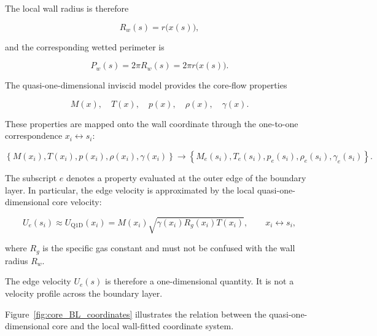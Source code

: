 The local wall radius is therefore

\begin{equation}
    R_w(s)=r\bigl(x(s)\bigr),
    \label{eq:local_wall_radius}
\end{equation}

and the corresponding wetted perimeter is

\begin{equation}
    \boxed{
    P_w(s)
    =
    2\pi R_w(s)
    =
    2\pi r\bigl(x(s)\bigr)
    }.
    \label{eq:wetted_perimeter_BL}
\end{equation}

The quasi-one-dimensional inviscid model provides the core-flow properties

\begin{equation}
    M(x),\quad
    T(x),\quad
    p(x),\quad
    \rho(x),\quad
    \gamma(x).
\end{equation}

These properties are mapped onto the wall coordinate through the one-to-one
correspondence \(x_i\leftrightarrow s_i\):

\begin{equation}
    \left\{
        M(x_i),T(x_i),p(x_i),\rho(x_i),\gamma(x_i)
    \right\}
    \longrightarrow
    \left\{
        M_e(s_i),T_e(s_i),p_e(s_i),\rho_e(s_i),\gamma_e(s_i)
    \right\}.
    \label{eq:edge_property_mapping}
\end{equation}

The subscript \(e\) denotes a property evaluated at the outer edge of the
boundary layer. In particular, the edge velocity is approximated by the local
quasi-one-dimensional core velocity:

\begin{equation}
    \boxed{
    U_e(s_i)
    \approx
    U_{\mathrm{Q1D}}(x_i)
    =
    M(x_i)
    \sqrt{
        \gamma(x_i)R_g(x_i)T(x_i)
    }
    },
    \qquad
    x_i\leftrightarrow s_i,
    \label{eq:Q1D_edge_velocity}
\end{equation}

where \(R_g\) is the specific gas constant and must not be confused with the
wall radius \(R_w\).

The edge velocity \(U_e(s)\) is therefore a one-dimensional quantity. It is
not a velocity profile across the boundary layer.

Figure~\ref{fig:core_BL_coordinates} illustrates the relation between the
quasi-one-dimensional core and the local wall-fitted coordinate system.


